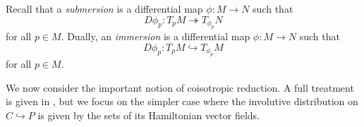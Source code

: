 \label{def:opposite_poisson_mfd}

\label{prop:coisotropic_relation}

\begin{tcolorbox}
    Recall that a \textit{submersion} is a differential map $\phi : M \rightarrow N$ such that
    \begin{equation}
        D \phi_p : T_pM \twoheadrightarrow T_{\phi_p}N
    \end{equation}
    for all $p \in M$.
    Dually, an \textit{immersion} is a differential map $\phi : M \rightarrow N$ such that
    \begin{equation}
        D \phi_p : T_pM \hookrightarrow T_{\phi_p}M
    \end{equation}
    for all $p \in M$.
\end{tcolorbox}
We now consider the important notion of coisotropic reduction. A full treatment is given in \citep{Marsden1986}, but we focus on the simpler case where the involutive distribution on $C \hookrightarrow P$ is given by the sets of its Hamiltonian vector fields.

